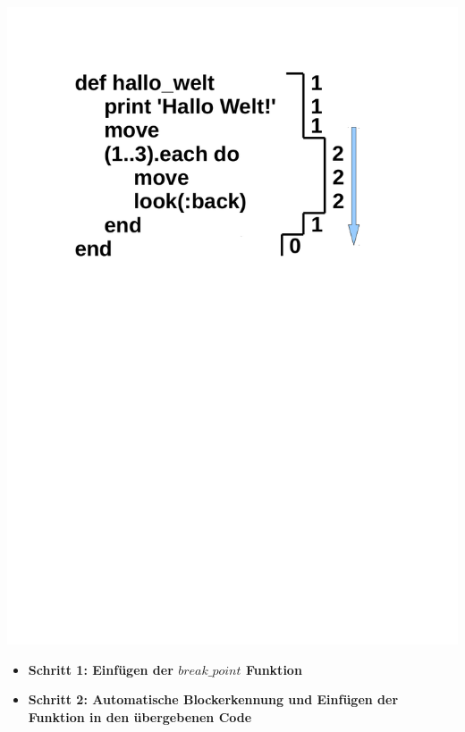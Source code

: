 \begin{frame}
	\begin{center}
		\includegraphics[scale=0.4]{scopes/beispiel3.pdf}
	\end{center}
\end{frame}

\begin{frame}

	\begin{itemize}
		\item[]\textbf{Schritt 1: Einfügen der $ break\_point $ Funktion} \\
		\item[]\textbf{Schritt 2: Automatische Blockerkennung und Einfügen der Funktion in den übergebenen Code} \\
	\end{itemize}
\end{frame}

